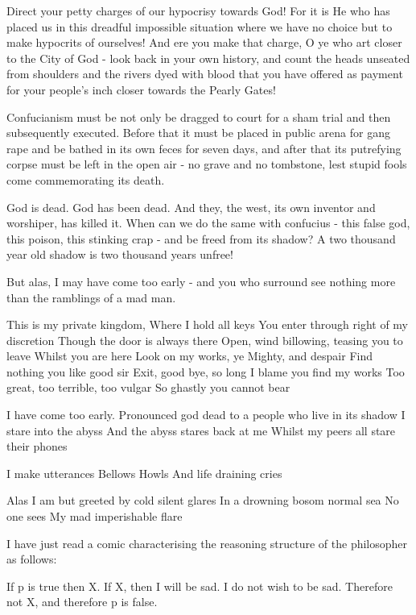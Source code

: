 Direct your petty charges of our hypocrisy towards God! For it is He who has placed us in this dreadful impossible situation where we have no choice but to make hypocrits of ourselves! And ere you make that charge, O ye who art closer to the City of God - look back in your own history, and count the heads unseated from shoulders and the rivers dyed with blood that you have offered as payment for your people's inch closer towards the Pearly Gates!  



Confucianism must be not only be dragged to court for a sham trial and then subsequently executed. Before that it must be placed in public arena for gang rape and be bathed in its own feces for seven days, and after that its putrefying corpse must be left in the open air - no grave and no tombstone, lest stupid fools come commemorating its death. 

God is dead. God has been dead. And they, the west, its own inventor and worshiper, has killed it. When can we do the same with confucius - this false god, this poison, this stinking crap - and be freed from its shadow? A two thousand year old shadow is two thousand years unfree! 

But alas, I may have come too early - and you who surround see nothing more than the ramblings of a mad man. 



This is my private kingdom,
Where I hold all keys 
You enter through right of my discretion 
Though the door is always there
Open, wind billowing, teasing you to leave 
Whilst you are here
Look on my works, ye Mighty, 
and despair
Find nothing you like good sir
Exit, good bye, so long
I blame you find my works  
Too great, too terrible, too vulgar 
So ghastly you cannot bear 

I have come too early. 
Pronounced god dead to a people who live in its shadow 
I stare into the abyss
And the abyss stares back at me 
Whilst my peers all stare their phones 

I make utterances 
Bellows 
Howls 
And life draining cries 

Alas 
I am but greeted by cold silent glares 
In a drowning bosom normal sea 
No one sees 
My mad imperishable flare 



I have just read a comic characterising the reasoning structure of the philosopher as follows: 

If p is true then X. 
If X, then I will be sad. 
I do not wish to be sad. 
Therefore not X, and therefore p is false. 

